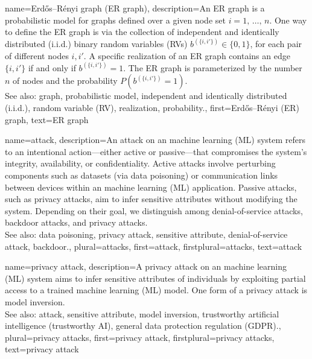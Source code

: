{
{name={Erd\H{o}s–R\'enyi graph (ER graph)},
	description={An ER graph is a probabilistic model for graphs defined over 
		a given node set $i=1, \,\ldots, \,n$. One way to define the ER graph is 
		via the collection of independent and identically distributed (i.i.d.) binary random variables (RVs) $b^{(\{i,i'\})} \in \{0,1\}$, 
		for each pair of different nodes $i, i'$. A specific realization  
		of an ER graph contains an edge $\{i,i'\}$ if and only if 
		$b^{(\{i,i'\})}=1$. The ER graph is parameterized by the 
		number $n$ of nodes and the probability $P\left(b^{(\{i,i'\})}=1\right)$. 
		\\
		See also: graph, probabilistic model, independent and identically distributed (i.i.d.), random variable (RV), realization, probability.},
	first={Erd\H{o}s–R\'enyi (ER) graph},
	text={ER graph}
}

{name={attack},  
	description={An attack on an machine learning (ML) system refers to an intentional action—either 
		active or passive—that compromises the system's integrity, availability, or confidentiality. 
		Active attacks involve perturbing components such as datasets (via data poisoning) 
		or communication links between devices within an machine learning (ML) application. Passive attacks, 
		such as privacy attacks, aim to infer sensitive attributes without modifying the system. 
		Depending on their goal, we distinguish among denial-of-service attacks, backdoor attacks, and privacy attacks.
		\\
		See also: data poisoning, privacy attack, sensitive attribute, denial-of-service attack, backdoor.},
	plural={attacks}, 
	first={attack},
	firstplural={attacks},
	text={attack}
}

{name={privacy attack},
	description={A privacy attack on an machine learning (ML) system aims to infer 
		sensitive attributes of individuals by exploiting partial access to a trained machine learning (ML) model. 
		One form of a privacy attack is model inversion.\\
		See also: attack, sensitive attribute, model inversion, trustworthy artificial intelligence (trustworthy AI), general data protection regulation (GDPR).},
	plural={privacy attacks}, 
	first={privacy attack},
	firstplural={privacy attacks}, 
	text={privacy attack}
}

}
